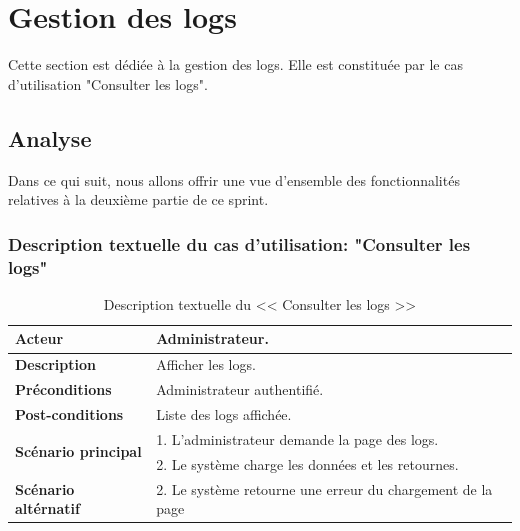 \section{Gestion des logs }
Cette section est dédiée à la gestion des logs. Elle est constituée par le cas d'utilisation "Consulter les logs".\\

\subsection{Analyse}
Dans ce qui suit, nous allons offrir une vue d'ensemble des fonctionnalités
relatives à la deuxième partie de ce sprint. 
\subsubsection{Description textuelle du cas d'utilisation: "Consulter les logs"}
\begin{table}[H]
	\begin{tabular}{|l|l|}
		\hline
		\textbf{Acteur}                              & Administrateur.                                            \\ \hline
		\textbf{Description}                         & Afficher les logs.                                         \\ \hline
		\textbf{Préconditions}                       & Administrateur authentifié.                                \\ \hline
		\textbf{Post-conditions}                     & Liste des logs affichée.                                   \\ \hline
		\multirow{2}{*}{\textbf{Scénario principal}} & 1. L'administrateur demande la page des logs.              \\ \cline{2-2} 
		& 2. Le système charge les données et les retournes.         \\ \hline
		\textbf{Scénario altérnatif}                 & 2. Le système retourne une erreur du chargement de la page \\ \hline
	\end{tabular}

\caption{Description textuelle du << Consulter les logs >> }
\label{Description textuelle du << Consulter les logs >>}
\end{table}
